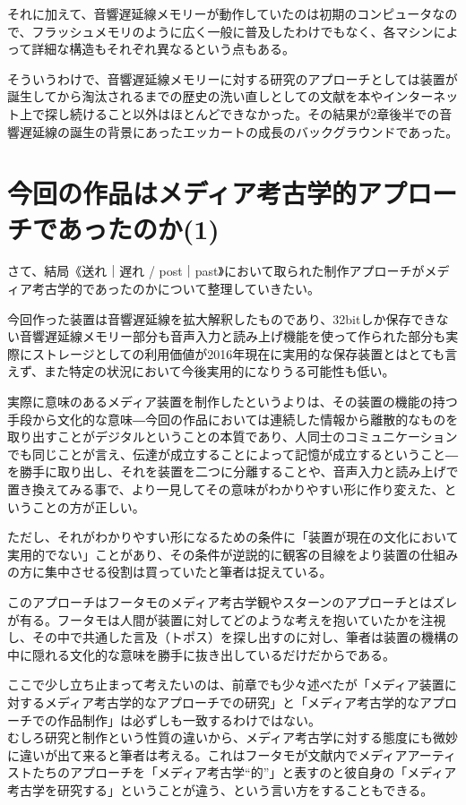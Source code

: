 \documentclass[a4paper,report]{jsbook}
\begin{document}
それに加えて、音響遅延線メモリーが動作していたのは初期のコンピュータなので、フラッシュメモリのように広く一般に普及したわけでもなく、各マシンによって詳細な構造もそれぞれ異なるという点もある。

そういうわけで、音響遅延線メモリーに対する研究のアプローチとしては装置が誕生してから淘汰されるまでの歴史の洗い直しとしての文献を本やインターネット上で探し続けること以外はほとんどできなかった。その結果が2章後半での音響遅延線の誕生の背景にあったエッカートの成長のバックグラウンドであった。

\section{今回の作品はメディア考古学的アプローチであったのか(1)}\label{ux4ecaux56deux306eux4f5cux54c1ux306fux30e1ux30c7ux30a3ux30a2ux8003ux53e4ux5b66ux7684ux30a2ux30d7ux30edux30fcux30c1ux3067ux3042ux3063ux305fux306eux304b1}

さて、結局《送れ｜遅れ /
post｜past》において取られた制作アプローチがメディア考古学的であったのかについて整理していきたい。

今回作った装置は音響遅延線を拡大解釈したものであり、32bitしか保存できない音響遅延線メモリー部分も音声入力と読み上げ機能を使って作られた部分も実際にストレージとしての利用価値が2016年現在に実用的な保存装置とはとても言えず、また特定の状況において今後実用的になりうる可能性も低い。

実際に意味のあるメディア装置を制作したというよりは、その装置の機能の持つ手段から文化的な意味―今回の作品においては連続した情報から離散的なものを取り出すことがデジタルということの本質であり、人同士のコミュニケーションでも同じことが言え、伝達が成立することによって記憶が成立するということ―を勝手に取り出し、それを装置を二つに分離することや、音声入力と読み上げで置き換えてみる事で、より一見してその意味がわかりやすい形に作り変えた、ということの方が正しい。

ただし、それがわかりやすい形になるための条件に「装置が現在の文化において実用的でない」ことがあり、その条件が逆説的に観客の目線をより装置の仕組みの方に集中させる役割は買っていたと筆者は捉えている。

このアプローチはフータモのメディア考古学観やスターンのアプローチとはズレが有る。フータモは人間が装置に対してどのような考えを抱いていたかを注視し、その中で共通した言及（トポス）を探し出すのに対し、筆者は装置の機構の中に隠れる文化的な意味を勝手に抜き出しているだけだからである。

ここで少し立ち止まって考えたいのは、前章でも少々述べたが「メディア装置に対するメディア考古学的なアプローチでの研究」と「メディア考古学的なアプローチでの作品制作」は必ずしも一致するわけではない。\\
むしろ研究と制作という性質の違いから、メディア考古学に対する態度にも微妙に違いが出て来ると筆者は考える。これはフータモが文献内でメディアアーティストたちのアプローチを「メディア考古学``的''」と表すのと彼自身の「メディア考古学を研究する」ということが違う、という言い方をすることもできる。
\end{document}
